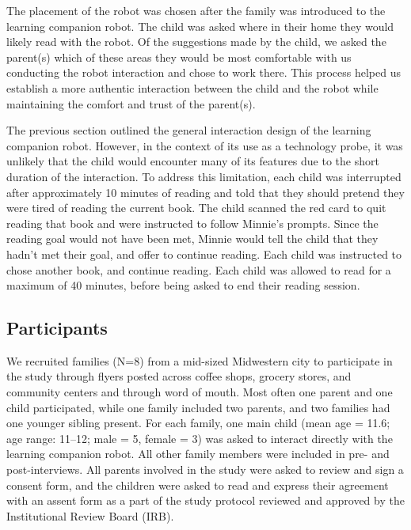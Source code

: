 \documentclass{sigchi}
\begin{document}
The placement of the robot was chosen after the family was introduced to the learning companion robot. The child was asked where in their home they would likely read with the robot. Of the suggestions made by the child, we asked the parent(s) which of these areas they would be most comfortable with us conducting the robot interaction and chose to work there. This process helped us establish a more authentic interaction between the child and the robot while maintaining the comfort and trust of the parent(s).

The previous section outlined the general interaction design of the learning companion robot. However, in the context of its use as a technology probe, it was unlikely that the child would encounter many of its features due to the short duration of the interaction. To address this limitation, each child was interrupted after approximately 10 minutes of reading and told that they should pretend they were tired of reading the current book. The child scanned the red card to quit reading that book and were instructed to follow Minnie's prompts. Since the reading goal would not have been met, Minnie would tell the child that they hadn't met their goal, and offer to continue reading. Each child was instructed to chose another book, and continue reading. Each child was allowed to read for a maximum of 40 minutes, before being asked to end their reading session.


\subsection{Participants}
 We recruited families (N=8) from a mid-sized Midwestern city to participate in the study through flyers posted across coffee shops, grocery stores, and community centers and through word of mouth. Most often one parent and one child participated, while one family included two parents, and two families had one younger sibling present. For each family, one main child (mean age = 11.6; age range: 11--12; male = 5, female = 3) was asked to interact directly with the learning companion robot. All other family members were included in pre- and post-interviews. All parents involved in the study were asked to review and sign a consent form, and the children were asked to read and express their agreement with an assent form as a part of the study protocol reviewed and approved by the Institutional Review Board (IRB).
\end{document}
